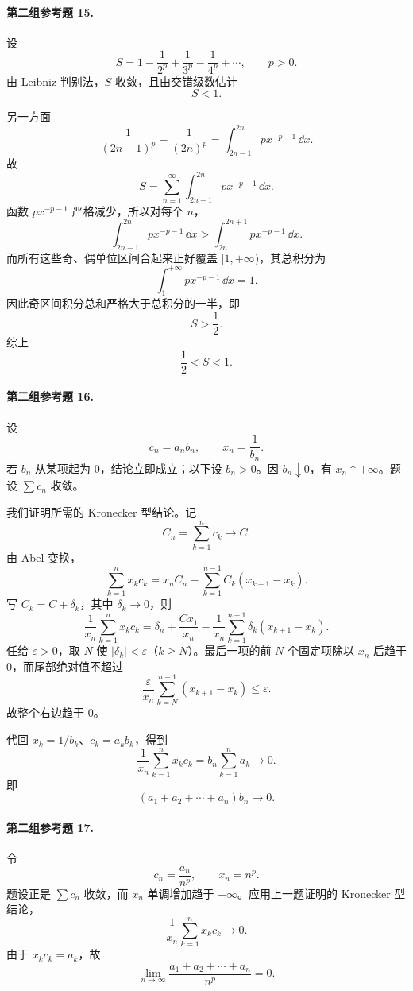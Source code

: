 \paragraph{第二组参考题 15.}
\begin{xsolution}
设
\[
 S=1-\frac1{2^p}+\frac1{3^p}-\frac1{4^p}+\cdots,
 \qquad p>0.
\]
由 Leibniz 判别法，$S$ 收敛，且由交错级数估计
\[
 S<1.
\]

另一方面
\[
 \frac1{(2n-1)^p}-\frac1{(2n)^p}
 =\int_{2n-1}^{2n}p x^{-p-1}\,\dd x.
\]
故
\[
 S=\sum_{n=1}^{\infty}\int_{2n-1}^{2n}p x^{-p-1}\,\dd x.
\]
函数 $p x^{-p-1}$ 严格减少，所以对每个 $n$，
\[
 \int_{2n-1}^{2n}p x^{-p-1}\,\dd x
 >\int_{2n}^{2n+1}p x^{-p-1}\,\dd x.
\]
而所有这些奇、偶单位区间合起来正好覆盖 $[1,+\infty)$，其总积分为
\[
 \int_1^{+\infty}p x^{-p-1}\,\dd x=1.
\]
因此奇区间积分总和严格大于总积分的一半，即
\[
 S>\frac12.
\]
综上
\[
 \boxed{\frac12<S<1}.
\]
\end{xsolution}

\paragraph{第二组参考题 16.}
\begin{xsolution}
设
\[
 c_n=a_nb_n,
 \qquad
 x_n=\frac1{b_n}.
\]
若 $b_n$ 从某项起为 $0$，结论立即成立；以下设 $b_n>0$。因 $b_n\downarrow0$，有 $x_n\uparrow+\infty$。题设 $\sum c_n$ 收敛。

我们证明所需的 Kronecker 型结论。记
\[
 C_n=\sum_{k=1}^{n}c_k\longrightarrow C.
\]
由 Abel 变换，
\[
 \sum_{k=1}^{n}x_kc_k
 =x_nC_n-\sum_{k=1}^{n-1}C_k(x_{k+1}-x_k).
\]
写 $C_k=C+\delta_k$，其中 $\delta_k\to0$，则
\[
 \frac1{x_n}\sum_{k=1}^{n}x_kc_k
 =\delta_n+\frac{Cx_1}{x_n}
 -\frac1{x_n}\sum_{k=1}^{n-1}\delta_k(x_{k+1}-x_k).
\]
任给 $\varepsilon>0$，取 $N$ 使 $|\delta_k|<\varepsilon$（$k\geq N$）。最后一项的前 $N$ 个固定项除以 $x_n$ 后趋于 $0$，而尾部绝对值不超过
\[
 \frac{\varepsilon}{x_n}\sum_{k=N}^{n-1}(x_{k+1}-x_k)\leq\varepsilon.
\]
故整个右边趋于 $0$。

代回 $x_k=1/b_k$、$c_k=a_kb_k$，得到
\[
 \frac1{x_n}\sum_{k=1}^{n}x_kc_k
 =b_n\sum_{k=1}^{n}a_k\longrightarrow0.
\]
即
\[
 \boxed{(a_1+a_2+\cdots+a_n)b_n\to0}.
\]
\end{xsolution}

\paragraph{第二组参考题 17.}
\begin{xsolution}
令
\[
 c_n=\frac{a_n}{n^p},
 \qquad
 x_n=n^p.
\]
题设正是 $\sum c_n$ 收敛，而 $x_n$ 单调增加趋于 $+\infty$。应用上一题证明的 Kronecker 型结论，
\[
 \frac1{x_n}\sum_{k=1}^{n}x_kc_k\longrightarrow0.
\]
由于 $x_kc_k=a_k$，故
\[
 \boxed{\lim_{n\to\infty}\frac{a_1+a_2+\cdots+a_n}{n^p}=0}.
\]
\end{xsolution}

